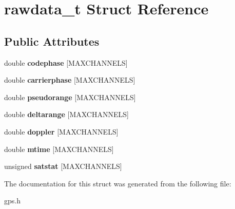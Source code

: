 \hypertarget{structrawdata__t}{\section{rawdata\-\_\-t \-Struct \-Reference}
\label{structrawdata__t}
}
\subsection*{\-Public \-Attributes}
\begin{DoxyCompactItemize}
\item 
\hypertarget{structrawdata__t_a93a34cb22cd3c80b178cdacb47d2fcc4}{double {\bfseries codephase} \mbox{[}\-M\-A\-X\-C\-H\-A\-N\-N\-E\-L\-S\mbox{]}}\label{structrawdata__t_a93a34cb22cd3c80b178cdacb47d2fcc4}

\item 
\hypertarget{structrawdata__t_a5401b6cac37962df4481552bbd8cff79}{double {\bfseries carrierphase} \mbox{[}\-M\-A\-X\-C\-H\-A\-N\-N\-E\-L\-S\mbox{]}}\label{structrawdata__t_a5401b6cac37962df4481552bbd8cff79}

\item 
\hypertarget{structrawdata__t_aa4235095eb7ccac680ae06df23fbca0c}{double {\bfseries pseudorange} \mbox{[}\-M\-A\-X\-C\-H\-A\-N\-N\-E\-L\-S\mbox{]}}\label{structrawdata__t_aa4235095eb7ccac680ae06df23fbca0c}

\item 
\hypertarget{structrawdata__t_a4ebe724d9188cdbcc600ab3d6c72f5fb}{double {\bfseries deltarange} \mbox{[}\-M\-A\-X\-C\-H\-A\-N\-N\-E\-L\-S\mbox{]}}\label{structrawdata__t_a4ebe724d9188cdbcc600ab3d6c72f5fb}

\item 
\hypertarget{structrawdata__t_abc4e84872feeff813b0ac2cd7cdd7ac5}{double {\bfseries doppler} \mbox{[}\-M\-A\-X\-C\-H\-A\-N\-N\-E\-L\-S\mbox{]}}\label{structrawdata__t_abc4e84872feeff813b0ac2cd7cdd7ac5}

\item 
\hypertarget{structrawdata__t_ad3f9cf741eb14ed74b0fb0488e0284bb}{double {\bfseries mtime} \mbox{[}\-M\-A\-X\-C\-H\-A\-N\-N\-E\-L\-S\mbox{]}}\label{structrawdata__t_ad3f9cf741eb14ed74b0fb0488e0284bb}

\item 
\hypertarget{structrawdata__t_a5618002eeb94f09dfbf4412940c81ec0}{unsigned {\bfseries satstat} \mbox{[}\-M\-A\-X\-C\-H\-A\-N\-N\-E\-L\-S\mbox{]}}\label{structrawdata__t_a5618002eeb94f09dfbf4412940c81ec0}

\end{DoxyCompactItemize}


\-The documentation for this struct was generated from the following file\-:\begin{DoxyCompactItemize}
\item 
gps.\-h\end{DoxyCompactItemize}
